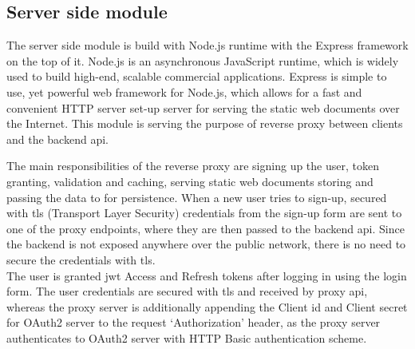 
\subsection{Server side module}\label{subsec:server-side-module}
The server side module is build with Node.js runtime with the Express framework on the top of it.
Node.js is an asynchronous JavaScript runtime, which is widely used to build high-end, scalable commercial applications.
Express is simple to use, yet powerful web framework for Node.js, which allows for a fast and convenient HTTP server set-up server for serving the static web documents over the Internet.
This module is serving the purpose of reverse proxy between clients and the backend \gls{api}.

The main responsibilities of the reverse proxy are signing up the user, token granting, validation and caching, serving static web documents storing and passing the data to for persistence.
When a new user tries to sign-up, secured with \gls{tls} (Transport Layer Security) credentials from the sign-up form are sent to one of the proxy endpoints, where they are then passed to the backend \gls{api}.
Since the backend is not exposed anywhere over the public network, there is no need to secure the credentials with \gls{tls}.\\
The user is granted \gls{jwt} Access and Refresh tokens after logging in using the login form.
The user credentials are secured with \gls{tls} and received by proxy \gls{api}, whereas the proxy server is additionally appending the Client id and Client secret for OAuth2 server to the request `Authorization' header, as the proxy server authenticates to OAuth2 server with HTTP Basic authentication scheme.

